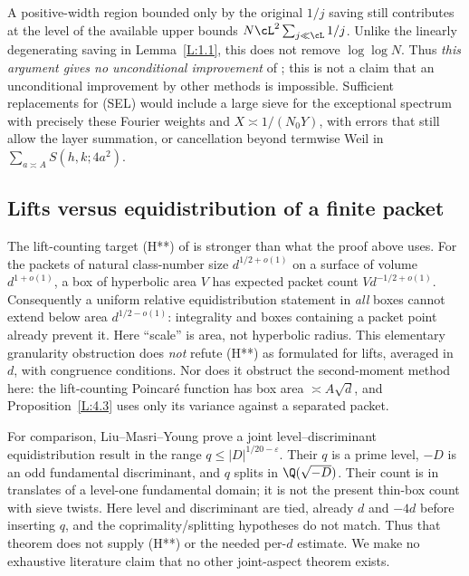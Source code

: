 A positive-width region bounded only by the original $1/j$ saving
still contributes at the level of the available upper bounds
$N\cL^2\sum_{j\ll\cL}1/j$.  Unlike the linearly degenerating
saving in Lemma~\ref{L:1.1}, this does not remove $\log\log N$.
Thus \emph{this argument gives no unconditional improvement} of
\cite[Theorem~1.1]{ET}; this is not a claim that an unconditional
improvement by other methods is impossible.  Sufficient replacements
for (SEL) would include a large sieve for the exceptional spectrum
with precisely these Fourier weights and $X\asymp1/(N_0Y)$, with
errors that still allow the layer summation, or cancellation beyond
termwise Weil in $\sum_{a\asymp A}S(h,k;4a^2)$.

\subsection{Lifts versus equidistribution of a finite packet}
The lift-counting target (H**) of \cite[\S3.5]{MN3} is stronger than
what the proof above uses.  For the packets of natural class-number
size $d^{1/2+o(1)}$ on a surface of volume $d^{1+o(1)}$, a box of
hyperbolic area $V$ has expected packet count $Vd^{-1/2+o(1)}$.
Consequently a uniform relative equidistribution statement in
\emph{all} boxes cannot extend below area $d^{1/2-o(1)}$: integrality
and boxes containing a packet point already prevent it.  Here
``scale'' is area, not hyperbolic radius.  This elementary granularity
obstruction does \emph{not} refute (H**) as formulated for lifts,
averaged in $d$, with congruence conditions.  Nor does it obstruct the
second-moment method here: the lift-counting Poincar\'e function has
box area $\asymp A\sqrt d$, and Proposition~\ref{L:4.3} uses only its
variance against a separated packet.

For comparison, Liu--Masri--Young
\cite[Theorem~1.4, and the more general Theorem~7.1]{LMY} prove a
joint level--discriminant equidistribution result in the range
$q\leq |D|^{1/20-\varepsilon}$.  Their $q$ is a prime level, $-D$ is
an odd fundamental discriminant, and $q$ splits in
$\Q(\sqrt{-D})$.  Their count is in translates of a level-one
fundamental domain; it is not the present thin-box count with sieve
twists.  Here level and discriminant are tied, already $d$ and $-4d$
before inserting $q$, and the coprimality/splitting hypotheses do not
match.  Thus that theorem does not supply (H**) or the needed per-$d$
estimate.  We make no exhaustive literature claim that no other
joint-aspect theorem exists.


